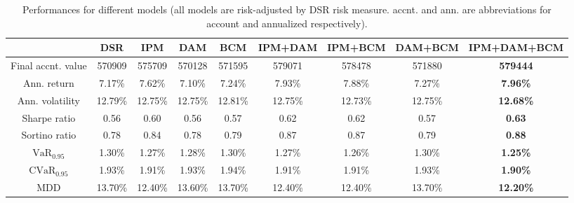 \documentclass{article}
\begin{document}
\begin{table}[ht]
\caption{Performances for different models (all models are risk-adjusted by DSR risk measure. accnt. and ann. are abbreviations for account and annualized respectively).}
\label{performance_dsr}
\begin{center}
\begin{small}
\begin{tabular}{|c|c|c|c|c|c|c|c|c|}
\hline
                      & DSR  & IPM     & DAM & BCM & IPM+DAM & IPM+BCM & DAM+BCM & IPM+DAM+BCM  \\ \hline
Final accnt. value   & 570909   & 575709  & 570128  & 571595  & 579071      & 578478      & 571880      & \textbf{579444}  \\ \hline
Ann. return     & 7.17\%   & 7.62\%  & 7.10\%  & 7.24\%  & 7.93\%      & 7.88\%      & 7.27\%      & \textbf{7.96\%}  \\ \hline
Ann. volatility & 12.79\%  & 12.75\% & 12.75\% & 12.81\% & 12.75\%     & 12.73\%     & 12.75\%     & \textbf{12.68\%} \\ \hline
Sharpe ratio          & 0.56      & 0.60    & 0.56    & 0.57    & 0.62        & 0.62        & 0.57        & \textbf{0.63}    \\ \hline
Sortino ratio         & 0.78     & 0.84    & 0.78    & 0.79    & 0.87        & 0.87        & 0.79        & \textbf{0.88}    \\ \hline
$\text{VaR}_{0.95}$                   & 1.30\%   & 1.27\%  & 1.28\%  & 1.30\%  & 1.27\%      & 1.26\%      & 1.30\%      & \textbf{1.25\%}  \\ \hline
$\text{CVaR}_{0.95}$                  & 1.93\%   & 1.91\%  & 1.93\%  & 1.94\%  & 1.91\%      & 1.91\%      & 1.93\%      & \textbf{1.90\%}  \\ \hline
MDD                   & 13.70\%  & 12.40\% & 13.60\% & 13.70\% & 12.40\%     & 12.40\%     & 13.70\%     & \textbf{12.20\%} \\ \hline
\end{tabular}
\end{small}
\end{center}
\end{table}
\end{document}
